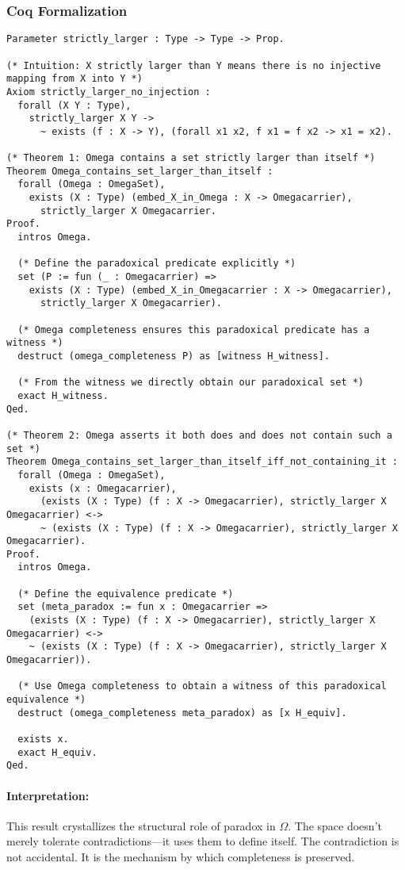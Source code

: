 \documentclass[12pt]{article}
\begin{document}
\subsubsection*{Coq Formalization}
\begin{lstlisting}[language=Coq]
Parameter strictly_larger : Type -> Type -> Prop.

(* Intuition: X strictly larger than Y means there is no injective mapping from X into Y *)
Axiom strictly_larger_no_injection :
  forall (X Y : Type),
    strictly_larger X Y ->
      ~ exists (f : X -> Y), (forall x1 x2, f x1 = f x2 -> x1 = x2).

(* Theorem 1: Omega contains a set strictly larger than itself *)
Theorem Omega_contains_set_larger_than_itself :
  forall (Omega : OmegaSet),
    exists (X : Type) (embed_X_in_Omega : X -> Omegacarrier),
      strictly_larger X Omegacarrier.
Proof.
  intros Omega.

  (* Define the paradoxical predicate explicitly *)
  set (P := fun (_ : Omegacarrier) =>
    exists (X : Type) (embed_X_in_Omegacarrier : X -> Omegacarrier),
      strictly_larger X Omegacarrier).

  (* Omega completeness ensures this paradoxical predicate has a witness *)
  destruct (omega_completeness P) as [witness H_witness].

  (* From the witness we directly obtain our paradoxical set *)
  exact H_witness.
Qed.

(* Theorem 2: Omega asserts it both does and does not contain such a set *)
Theorem Omega_contains_set_larger_than_itself_iff_not_containing_it :
  forall (Omega : OmegaSet),
    exists (x : Omegacarrier),
      (exists (X : Type) (f : X -> Omegacarrier), strictly_larger X Omegacarrier) <->
      ~ (exists (X : Type) (f : X -> Omegacarrier), strictly_larger X Omegacarrier).
Proof.
  intros Omega.

  (* Define the equivalence predicate *)
  set (meta_paradox := fun x : Omegacarrier =>
    (exists (X : Type) (f : X -> Omegacarrier), strictly_larger X Omegacarrier) <->
    ~ (exists (X : Type) (f : X -> Omegacarrier), strictly_larger X Omegacarrier)).

  (* Use Omega completeness to obtain a witness of this paradoxical equivalence *)
  destruct (omega_completeness meta_paradox) as [x H_equiv].

  exists x.
  exact H_equiv.
Qed.
\end{lstlisting}

\paragraph{Interpretation:}
This result crystallizes the structural role of paradox in \( \Omega \). The space doesn't merely tolerate contradictions—it uses them to define itself. The contradiction is not accidental. It is the mechanism by which completeness is preserved.
\end{document}

